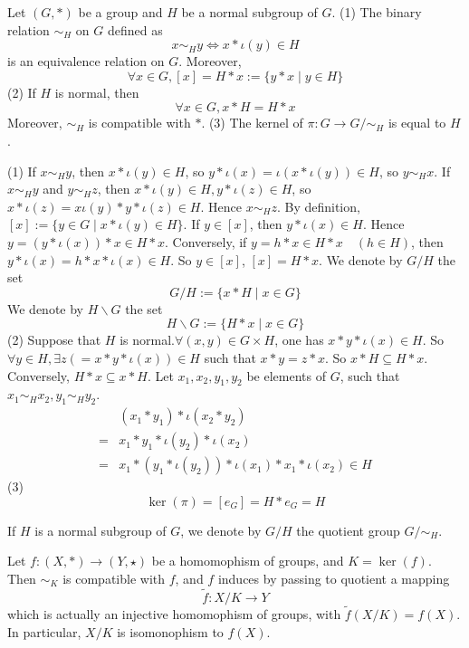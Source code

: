 \documentclass{book}
\numberwithin{equation}{section}
\begin{document}
\begin{propositionenv}
    Let $(G,*)$ be a group and $H$ be a normal subgroup of $G$.
    \newline
    (1) The binary relation $\sim_H$ on $G$ defined as 
    $$x\sim_H y\Leftrightarrow x*\iota(y)\in H$$
    is an equivalence relation on $G$. Moreover, 
    $$\forall x\in G, [x]=H*x:=\{y*x\mid y\in H\}$$
    (2) If $H$ is normal, then
    $$\forall x\in G,x*H=H*x$$
    Moreover, $\sim_H$ is compatible with $*$.
    \newline
    (3) The kernel of $\pi :G\rightarrow G/\sim_H$ is equal to $H$.
\end{propositionenv}
\begin{proofenv}
    \quad\newline
    (1) If $x\sim_H y$, then $x*\iota(y)\in H$, so $y*\iota(x)=\iota(x*\iota(y))\in H$, so $y\sim_H x$. If $x\sim_H y$ and $y\sim_H z$, then $x*\iota(y)\in H, y*\iota(z)\in H$, so $x*\iota(z)=x\iota(y)*y*\iota(z)\in H$. Hence $x\sim_H z$. By definition, $[x]:=\{y\in G\mid  x*\iota(y)\in H\}$. If $y\in [x]$, then $y*\iota(x)\in H$. Hence $y=(y*\iota(x))*x\in H*x$. Conversely, if $y=h*x\in H*x \quad (h\in H)$, then $y*\iota(x)=h*x*\iota(x)\in H$. So $y\in [x]$, $[x]=H*x$.
    \newline
    We denote by $G/H $ the set 
    $$G/H:=\{x*H\mid x\in G\}$$ 
    We denote by $H\backslash G$ the set 
    $$H\backslash G:=\{H*x\mid x\in G\}$$
    (2) Suppose that $H$ is normal.$\forall (x,y)\in G\times H$, one has $x*y*\iota(x)\in H$. So $\forall y\in H,\exists z(=x*y*\iota(x))\in H$ such that $x*y=z*x$. So $x*H\subseteq H*x$. Conversely, $H*x\subseteq x*H$. Let $x_1,x_2,y_1,y_2$ be elements of $G$, such that $x_1\sim_H x_2,y_1\sim_H y_2$.
    \begin{align*}
&(x_1*y_1)*\iota (x_2*y_2)\\
=&x_1*y_1*\iota (y_2)*\iota (x_2)\\
=&x_1*(y_1*\iota (y_2))*\iota (x_1)*x_1*\iota (x_2)\in H
\end{align*}
    (3)$$\ker(\pi)=[e_G]=H*e_G=H$$
\end{proofenv}
\begin{notationenv}
    If $H$ is a normal subgroup of $G$, we denote by $G/H$ the quotient group $G/\sim_H$.
\end{notationenv}
\begin{theoremenv}
    Let $f:(X,*)\rightarrow (Y,\star)$ be a homomophism of groups, and $K=\ker(f)$. Then $\sim_K$ is compatible with $f$, and $f$ induces by passing to quotient a mapping
    $$\tilde{f}:X/K\longrightarrow Y$$
    which is actually an injective homomophism of groups, with $\tilde{f}(X/K)=f(X)$. In particular, $X/K$ is isomonophism to $f(X)$.
        \begin{center}
\end{center}
\end{theoremenv}
\end{document}
